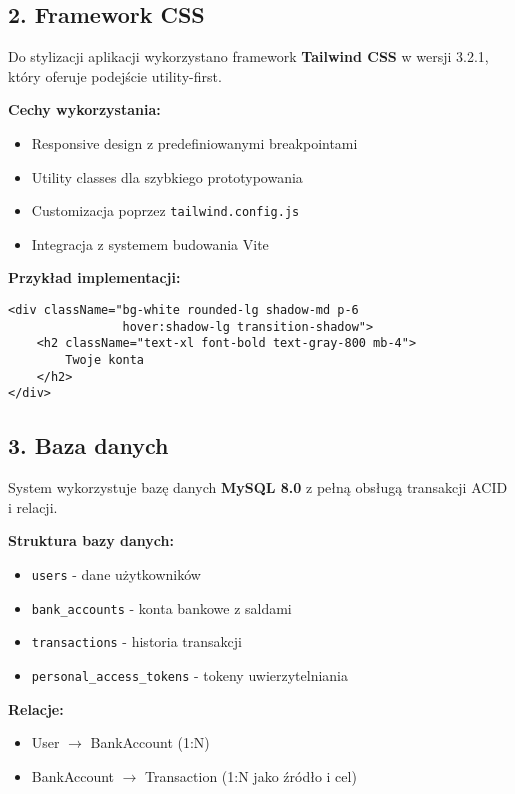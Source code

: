 \subsection{2. Framework CSS}

Do stylizacji aplikacji wykorzystano framework \textbf{Tailwind CSS} w wersji 3.2.1, który oferuje podejście utility-first.

\textbf{Cechy wykorzystania:}
\begin{itemize}
    \item Responsive design z predefiniowanymi breakpointami
    \item Utility classes dla szybkiego prototypowania
    \item Customizacja poprzez \texttt{tailwind.config.js}
    \item Integracja z systemem budowania Vite
\end{itemize}

\textbf{Przykład implementacji:}
\begin{verbatim}
<div className="bg-white rounded-lg shadow-md p-6
                hover:shadow-lg transition-shadow">
    <h2 className="text-xl font-bold text-gray-800 mb-4">
        Twoje konta
    </h2>
</div>
\end{verbatim}

\subsection{3. Baza danych}

System wykorzystuje bazę danych \textbf{MySQL 8.0} z pełną obsługą transakcji ACID i relacji.

\textbf{Struktura bazy danych:}
\begin{itemize}
    \item \texttt{users} - dane użytkowników
    \item \texttt{bank\_accounts} - konta bankowe z saldami
    \item \texttt{transactions} - historia transakcji
    \item \texttt{personal\_access\_tokens} - tokeny uwierzytelniania
\end{itemize}

\textbf{Relacje:}
\begin{itemize}
    \item User $\rightarrow$ BankAccount (1:N)
    \item BankAccount $\rightarrow$ Transaction (1:N jako źródło i cel)
\end{itemize}

